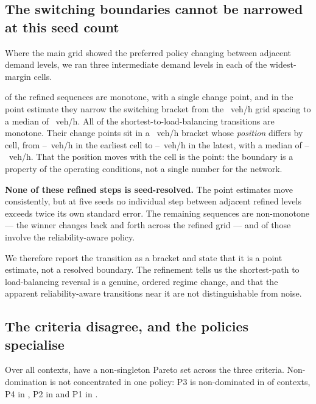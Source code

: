 \subsection{The switching boundaries cannot be narrowed at this seed count}

Where the main grid showed the preferred policy changing between adjacent
demand levels, we ran three intermediate demand levels in each of the
\NumBoundN{} widest-margin cells.

\NumBoundMono{} of the \NumBoundN{} refined sequences are monotone, with a
single change point, and in the point estimate they narrow the switching
bracket from the \NumBoundGrid~veh/h grid spacing to a median of
\NumBoundWidth~veh/h. All \NumBoundPOneN{} of the shortest-to-load-balancing
transitions are monotone. Their change points sit in a
\NumBoundWidth~veh/h bracket whose \emph{position} differs by cell, from
\NumBoundPOneEarliestLo--\NumBoundPOneEarliestHi~veh/h in the earliest cell to
\NumBoundPOneLatestLo--\NumBoundPOneLatestHi~veh/h in the latest, with a median
of \NumBoundPOneMedLo--\NumBoundPOneMedHi~veh/h. That the position moves with
the cell is the point: the boundary is a property of the operating conditions,
not a single number for the network.

\textbf{None of these refined steps is seed-resolved.} The point estimates move
consistently, but at five seeds no individual step between adjacent refined
levels exceeds twice its own standard error. The remaining \NumBoundNonMono{}
sequences are non-monotone --- the winner changes back and forth across the
refined grid --- and \NumBoundNonMonoPFour{} of those involve the
reliability-aware policy.

We therefore report the transition as a bracket and state that it is a point
estimate, not a resolved boundary. The refinement tells us the shortest-path to
load-balancing reversal is a genuine, ordered regime change, and that the
apparent reliability-aware transitions near it are not distinguishable from
noise.

\subsection{The criteria disagree, and the policies specialise}

Over all \NumContextsAnalysed{} contexts, \NumParetoNonSingleton{} have a
non-singleton Pareto set across the three criteria. Non-domination is not
concentrated in one policy: P3 is non-dominated in \NumParetoPctPThree{} of
contexts, P4 in \NumParetoPctPFour{}, P2 in \NumParetoPctPTwo{} and P1 in
\NumParetoPctPOne{}.

